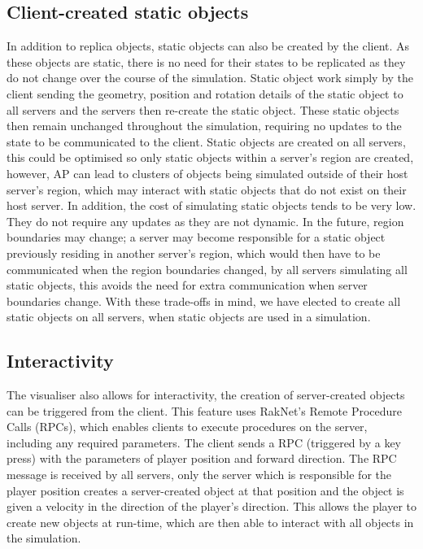 \subsection{Client-created static objects}\label{Client-CreatedReplicas}
In addition to replica objects, static objects can also be created by the client. As these objects are static, there is no need for their states to be replicated as they do not change over the course of the simulation. Static object work simply by the client sending the geometry, position and rotation details of the static object to all servers and the servers then re-create the static object. These static objects then remain unchanged throughout the simulation, requiring no updates to the state to be communicated to the client. Static objects are created on all servers, this could be optimised so only static objects within a server's region are created, however, AP can lead to clusters of objects being simulated outside of their host server's region, which may interact with static objects that do not exist on their host server. In addition, the cost of simulating static objects tends to be very low. They do not require any updates as they are not dynamic. In the future, region boundaries may change; a server may become responsible for a static object previously residing in another server's region, which would then have to be communicated when the region boundaries changed, by all servers simulating all static objects, this avoids the need for extra communication when server boundaries change. With these trade-offs in mind, we have elected to create all static objects on all servers, when static objects are used in a simulation.

\subsection{Interactivity}\label{Interactivity}
The visualiser also allows for interactivity, the creation of server-created objects can be triggered from the client. This feature uses RakNet's Remote Procedure Calls (RPCs), which enables clients to execute procedures on the server, including any required parameters. The client sends a RPC (triggered by a key press) with the parameters of player position and forward direction. The RPC message is received by all servers, only the server which is responsible for the player position creates a server-created object at that position and the object is given a velocity in the direction of the player's direction. This allows the player to create new objects at run-time, which are then able to interact with all objects in the simulation.

